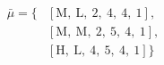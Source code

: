 \begin{equation}
\nonumber
\begin{aligned}
\bar{\mu} = \{  & \left[\text{M}, \ \text{L}, \ \text{2}, \ \text{4}, \ \text{4}, \ \text{1}\right], \\  & \left[\text{M}, \ \text{M}, \ \text{2}, \ \text{5}, \ \text{4}, \ \text{1}\right], \\  & \left[\text{H}, \ \text{L}, \ \text{4}, \ \text{5}, \ \text{4}, \ \text{1}\right]\} \\ 
\end{aligned}
\end{equation} \\ 